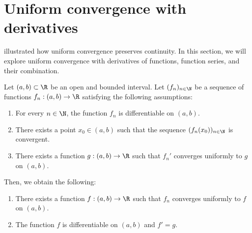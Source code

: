 \section{Uniform convergence with derivatives}
\label{sec:unif_diff}
 illustrated how uniform convergence preserves continuity. In this section, we will explore uniform convergence with derivatives of functions, function series, and their combination.
\begin{thm}
	\label{thm:unif_cvg_diff}
	Let $(a,b)\subset \R$ be an open and bounded interval. Let $(f_n)_{n\in\N}$ be a sequence of functions $f_n:(a,b)\to \R$ satisfying the following assumptions:
	\begin{enumerate}[label = \textbf{A\roman*)}]
		\item \label{unif_cvg_diff_1} For every $n\in\N$, the function $f_n$ is differentiable on $(a,b)$.
		\item \label{unif_cvg_diff_2} There exists a point $x_0 \in (a,b)$ such that the sequence $(f_n(x_0))_{n\in\N}$ is convergent.
		\item \label{unif_cvg_diff_3} There exists a function $g:(a,b)\to \R$ such that $f_n'$ converges uniformly to $g$ on $(a,b)$.
	\end{enumerate}
	Then, we obtain the following:
	\begin{enumerate}[label = \textbf{C\roman*)}]
		\item \label{unif_cvg_diff_C1} There exists a function $f:(a,b)\to \R$ such that $f_n$ converges uniformly to $f$ on $(a,b)$.
		\item \label{unif_cvg_diff_C2} The function $f$ is differentiable on $(a,b)$ and $f' = g$.
	\end{enumerate}
\end{thm}
